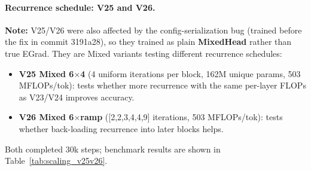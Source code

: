 \paragraph{Recurrence schedule: V25 and V26.}
\textbf{Note:} V25/V26 were also affected by the config-serialization bug (trained before the fix
in commit 3191a28), so they trained as plain \textbf{MixedHead} rather than true EGrad.
They are Mixed variants testing different recurrence schedules:
\begin{itemize}
  \item \textbf{V25 Mixed 6$\times$4} (4 uniform iterations per block, 162M unique params,
    503 MFLOPs/tok): tests whether more recurrence with the same per-layer FLOPs as V23/V24 improves accuracy.
  \item \textbf{V26 Mixed 6$\times$ramp} ([2,2,3,4,4,9] iterations, 503 MFLOPs/tok):
    tests whether back-loading recurrence into later blocks helps.
\end{itemize}
Both completed 30k steps; benchmark results are shown in Table~\ref{tab:scaling_v25v26}.

\begin{table}[h]
\centering
\caption{Recurrence-schedule ablation (Mixed, 162M unique params, 503 MFLOPs/tok, 30k steps).
  V23/V24 (12$\times$2) and V9 GPT shown for reference.}
\label{tab:scaling_v25v26}
\resizebox{\textwidth}{!}{%
}
\end{table}

